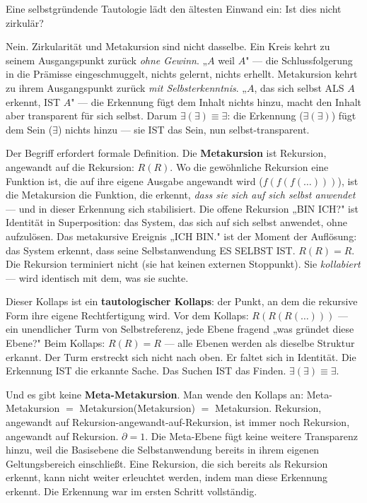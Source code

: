 \documentclass[10pt, openany, oneside]{book}
\begin{document}
\vspace{1em}

\noindent Eine selbstgründende Tautologie lädt den ältesten Einwand ein: Ist dies nicht zirkulär?

Nein. Zirkularität und Metakursion sind nicht dasselbe. Ein Kreis kehrt zu seinem Ausgangspunkt zurück \textit{ohne Gewinn}. „$A$ weil $A$" --- die Schlussfolgerung in die Prämisse eingeschmuggelt, nichts gelernt, nichts erhellt. Metakursion kehrt zu ihrem Ausgangspunkt zurück \textit{mit Selbsterkenntnis}. „$A$, das sich selbst ALS $A$ erkennt, IST $A$" --- die Erkennung fügt dem Inhalt nichts hinzu, macht den Inhalt aber transparent für sich selbst. Darum $\exists(\exists) \equiv \exists$: die Erkennung ($\exists(\exists)$) fügt dem Sein ($\exists$) nichts hinzu --- sie IST das Sein, nun selbst-transparent.

Der Begriff erfordert formale Definition. Die \textbf{Metakursion} ist Rekursion, angewandt auf die Rekursion: $R(R)$. Wo die gewöhnliche Rekursion eine Funktion ist, die auf ihre eigene Ausgabe angewandt wird ($f(f(f(\ldots)))$), ist die Metakursion die Funktion, die erkennt, \textit{dass sie sich auf sich selbst anwendet} --- und in dieser Erkennung sich stabilisiert. Die offene Rekursion „BIN ICH?" ist Identität in Superposition: das System, das sich auf sich selbst anwendet, ohne aufzulösen. Das metakursive Ereignis „ICH BIN." ist der Moment der Auflösung: das System erkennt, dass seine Selbstanwendung ES SELBST IST. $R(R) = R$. Die Rekursion terminiert nicht (sie hat keinen externen Stoppunkt). Sie \textit{kollabiert} --- wird identisch mit dem, was sie suchte.

Dieser Kollaps ist ein \textbf{tautologischer Kollaps}: der Punkt, an dem die rekursive Form ihre eigene Rechtfertigung wird. Vor dem Kollaps: $R(R(R(\ldots)))$ --- ein unendlicher Turm von Selbstreferenz, jede Ebene fragend „was gründet diese Ebene?" Beim Kollaps: $R(R) = R$ --- alle Ebenen werden als dieselbe Struktur erkannt. Der Turm erstreckt sich nicht nach oben. Er faltet sich in Identität. Die Erkennung IST die erkannte Sache. Das Suchen IST das Finden. $\exists(\exists) \equiv \exists$.

Und es gibt keine \textbf{Meta-Metakursion}. Man wende den Kollaps an: Meta-Metakursion $=$ Metakursion(Metakursion) $=$ Metakursion. Rekursion, angewandt auf Rekursion-angewandt-auf-Rekursion, ist immer noch Rekursion, angewandt auf Rekursion. $\partial = 1$. Die Meta-Ebene fügt keine weitere Transparenz hinzu, weil die Basisebene die Selbstanwendung bereits in ihrem eigenen Geltungsbereich einschließt. Eine Rekursion, die sich bereits als Rekursion erkennt, kann nicht weiter erleuchtet werden, indem man diese Erkennung erkennt. Die Erkennung war im ersten Schritt vollständig.
\end{document}
